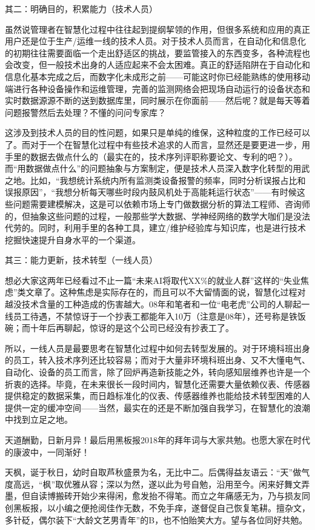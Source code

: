 \documentclass[
]{book}
\begin{document}
其二：明确目的，积累能力（技术人员）

虽然说管理者在智慧化过程中往往起到提纲挈领的作用，但很多系统和应用的真正用户还是位于生产/运维一线的技术人员。对于技术人员而言，在自动化和信息化的初期往往需要面临一个走出舒适区的挑战，要监管接入的东西变多，各种流程也会改变，但一般技术出身的人适应起来不会太困难。真正的舒适陷阱在于自动化和信息化基本完成之后，而数字化未成形之前------可能这时你已经能熟练的使用移动端进行各种设备操作和运维管理，完善的监测网络会把现场自动运行的设备状态和实时数据源源不断的送到数据库里，同时展示在你面前------然后呢？就是每天等着问题报警然后去处理？不懂的问问专家库？

这涉及到技术人员的目的性问题，如果只是单纯的维保，这种粒度的工作已经可以了。而对于一个在智慧化过程中有些技术追求的人而言，显然还是要更进一步，用手里的数据去做点什么的（最实在的，技术序列评职称要论文、专利的吧？）。而``用数据做点什么''的问题抽象与方案制定，便是技术人员深入数字化转型的用武之地。比如，``我想统计系统内所有监测类设备报警的频率，同时分析误报占比和误报原因''，``我想分析每天哪些时段内鼓风机处于高能耗运行状态''------有时候这些问题需要建模解决，这是可以依赖市场上专门做数据分析的算法工程师、咨询师的，但抽象这些问题的过程，一般那些学大数据、学神经网络的数学大咖们是没法代劳的。同时，利用手里的各种工具，建立/维护经验库与知识库，也是进行技术挖掘快速提升自身水平的一个渠道。

其三：能力更新，技术转型（一线人员）

想必大家这两年已经看过不止一篇``未来AI将取代XX\%的就业人群''这样的``失业焦虑''类文章了。这种焦虑是实际存在的，而且可以不大留情面的说，智慧化过程对越没技术含量的工种造成的伤害越大。08年和笔者和一位``电老虎''公司的人聊起一线员工待遇，不禁惊讶于一个抄表工都能年入10万（注意是08年），还号称是铁饭碗；而十年后再聊起，惊讶的是这个公司已经没有抄表工了。

所以，一线人员是最要思考在智慧化过程中如何去转型发展的。对于环境科班出身的员工，转入技术序列还比较容易；而对于大量非环境科班出身、又不大懂电气、自动化、设备的员工而言，除了回炉再造新技能之外，转向感知层维养也许是一个折衷的选择。毕竟，在未来很长一段时间内，智慧化还需要大量依赖仪表、传感器提供稳定的数据采集，而日趋标准化的仪表、传感器维养也能给技术转型困难的人提供一定的缓冲空间------当然，最实在的还是不断加强自我学习，在智慧化的浪潮中找到立足之地。

天道酬勤，日新月异！最后用黑板报2018年的拜年词与大家共勉。也愿大家在时代的康波中，一同渐好！

天枫，诞于秋日，幼时自取芦秋盛景为名，无比中二。后偶得益友语云：``天''做气度高远，``枫''取优雅从容；深以为然，遂以此为号自勉，沿用至今。闲来好舞文弄墨，但自读博搬砖开始少来得闲，愈发抬不得笔。而立之年痛感无为，乃与损友同创黑板报，以小编之便抢阅佳作无数，不免手痒，遂督促自己恢复笔耕。擅杂文，多针砭，偶尔装下``大龄文艺男青年''的B，也不怕贻笑大方。望与各位同好共勉。
\end{document}
